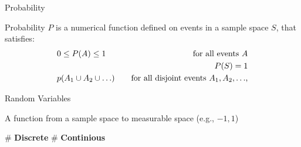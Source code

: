 \documentclass[12pt, aspectratio=149]{beamer}
\theoremstyle{plain}
\begin{document}
\begin{frame}[fragile]{Probability}

	Probability $P$ is a numerical function defined on events in a sample space $S$, that satisfies:
	\begin{align*}
		& 0 \leq P(A) \leq 1 & \text{for all events $A$} \\
		& & P(S) = 1 \\
		& p(A_{1} \cup A_{2} \cup \ldots) \hspace*{1em} & \text{for all disjoint events $A_{1}, A_{2}, \ldots$,}	
	\end{align*}  
	
\end{frame}

\begin{frame}[fragile]{Random Variables}

	A function from a sample space to measurable space (e.g., ${-1, 1}$)

	\begin{easylist}[itemize]
		# \textbf{Discrete}
		# \textbf{Continious}
			\end{easylist}
\end{frame}
\end{document}

